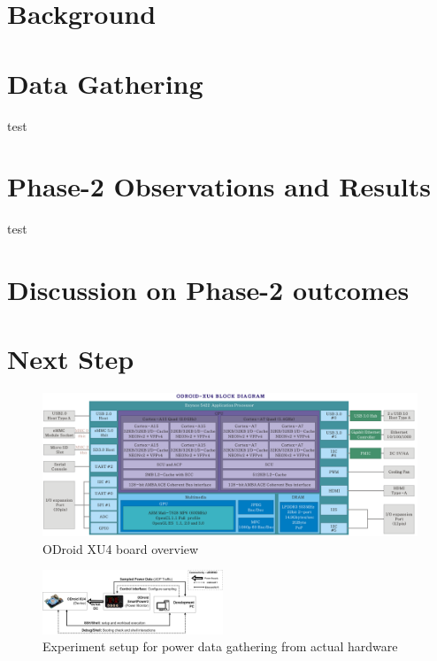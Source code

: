 \documentclass[conference]{IEEEtran}
\begin{document}
\section{Background}


\section{Data Gathering}
    \par test


\section{Phase-2 Observations and Results}
    \par test

\section{Discussion on Phase-2 outcomes}

\section{Next Step}

\begin{figure}[b]
    \includegraphics{rsrc/201506191222574523.png}
    \caption{ODroid XU4 board overview}
    \label{fig-odroid-hwoverview}
\end{figure}


\begin{figure}[t]
    \centering
    \includegraphics[width=0.48\textwidth]{rsrc/Experiment-setup.drawio.png}
    \caption{Experiment setup for power data gathering from actual hardware}
    \label{fig-Experiment-setup}
\end{figure}
\end{document}
